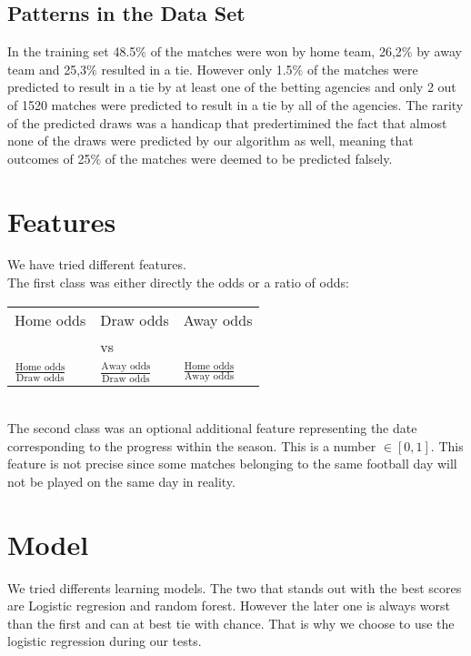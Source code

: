 \documentclass[11pt]{article}
\begin{document}
\subsection{Patterns in the Data Set}

In the training set 48.5$\%$ of the matches were won by home team, 26,2$\%$ by away team and 25,3$\%$ resulted in a tie. However only 1.5$\%$ of the matches were predicted to result in a tie by at least one of the betting agencies and only 2 out of 1520 matches were predicted to result in a tie by all of the agencies. The rarity of the predicted draws was a handicap that predertimined the fact that almost none of the draws were predicted by our algorithm as well, meaning that outcomes of 25$\%$ of the matches were deemed to be predicted falsely.  


\section{Features}

We have tried different features.\\
The first class was either directly the odds or a ratio of odds:\\
\begin{center}
	\begin{tabular}{lll}
		Home odds & Draw odds & Away odds \\
		& vs & \\
		$\frac{\text{Home odds}}{\text{Draw odds}}$ & $\frac{\text{Away odds}}{\text{Draw odds}}$ & $\frac{\text{Home odds}}{\text{Away odds}}$
	\end{tabular}	
\end{center}
	~\\
The second class was an optional additional feature representing the date corresponding to the progress within the season. This is a number $\in [0,1]$. This feature is not precise since some matches belonging to the same football day will not be played on the same day in reality.

\section{Model}

We tried differents learning models. The two that stands out with the best scores are Logistic regresion and random forest. However the later one is always worst than the first and can at best tie with chance. That is why we choose to use the logistic regression during our tests.
\end{document}
